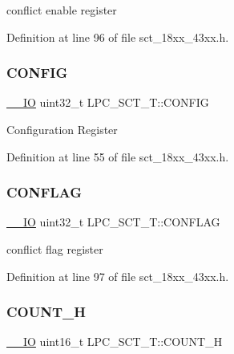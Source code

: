 conflict enable register 

Definition at line 96 of file sct\+\_\+18xx\+\_\+43xx.\+h.

\mbox{\label{struct_l_p_c___s_c_t___t_a547339230de8c959e1edabc81af46a81}} 
\subsubsection{\texorpdfstring{C\+O\+N\+F\+IG}{CONFIG}}
{\footnotesize\ttfamily \hyperlink{core__sc300_8h_aec43007d9998a0a0e01faede4133d6be}{\+\_\+\+\_\+\+IO} uint32\+\_\+t L\+P\+C\+\_\+\+S\+C\+T\+\_\+\+T\+::\+C\+O\+N\+F\+IG}

Configuration Register 

Definition at line 55 of file sct\+\_\+18xx\+\_\+43xx.\+h.

\mbox{\label{struct_l_p_c___s_c_t___t_aeaa0c7af7f080325b6b5360add390e0b}} 
\subsubsection{\texorpdfstring{C\+O\+N\+F\+L\+AG}{CONFLAG}}
{\footnotesize\ttfamily \hyperlink{core__sc300_8h_aec43007d9998a0a0e01faede4133d6be}{\+\_\+\+\_\+\+IO} uint32\+\_\+t L\+P\+C\+\_\+\+S\+C\+T\+\_\+\+T\+::\+C\+O\+N\+F\+L\+AG}

conflict flag register 

Definition at line 97 of file sct\+\_\+18xx\+\_\+43xx.\+h.

\mbox{\label{struct_l_p_c___s_c_t___t_a85875c8186655c878aad03c123c73baf}} 
\subsubsection{\texorpdfstring{C\+O\+U\+N\+T\+\_\+H}{COUNT\_H}}
{\footnotesize\ttfamily \hyperlink{core__sc300_8h_aec43007d9998a0a0e01faede4133d6be}{\+\_\+\+\_\+\+IO} uint16\+\_\+t L\+P\+C\+\_\+\+S\+C\+T\+\_\+\+T\+::\+C\+O\+U\+N\+T\+\_\+H}

